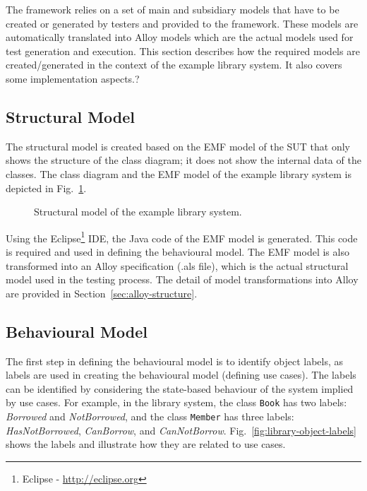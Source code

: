 %
%
\label{sec:create-test-model}
The framework relies on a set of main and subsidiary models that have to be  created or generated by testers and provided to the framework. These models are automatically translated into Alloy models which are the actual models used for test generation and execution. This section describes how the required models are created/generated in the context of the example library system. It also covers some implementation aspects.?

\subsection{Structural Model}
\label{sec:create-test model-structure}
The structural model is created based on the EMF model of the SUT that only shows the structure of the class diagram; it does not show the internal data of the classes. The class diagram and the EMF model of the example library system is depicted in Fig.~\ref{fig:library-structure-model}.

\begin{figure}[h]
\centering
{}
\hfil
{}
\caption{Structural model of the example library system.}
\label{fig:library-structure-model}
\end{figure} 

Using the Eclipse\footnote{Eclipse - \url{http://eclipse.org}} IDE, the Java code of the EMF model is generated. This code is required and used in defining the behavioural model. The EMF model is also transformed into an Alloy specification (.als file), which is the actual structural model used in the testing process. The detail of model transformations into Alloy are provided in Section~\ref{sec:alloy-structure}.

\subsection{Behavioural Model}
\label{sec:create-test model-behaviour}
The first step in defining the behavioural model is to identify object labels, as labels are used in creating the behavioural model (defining use cases). The labels can be identified by considering the state-based behaviour of the system implied by use cases. For example, in the library system, the class \texttt{Book} has two labels: \textit{Borrowed} and \textit{NotBorrowed}, and the class \texttt{Member} has three labels: \textit{HasNotBorrowed}, \textit{CanBorrow}, and \textit{CanNotBorrow}. Fig.~\ref{fig:library-object-labels} shows the labels and illustrate how they are related to use cases.

